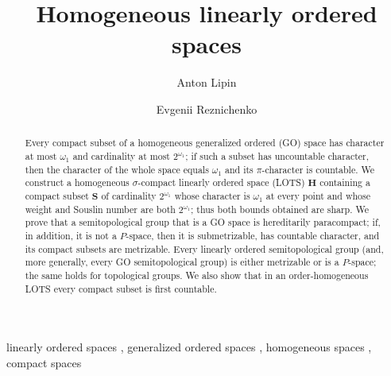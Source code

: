 \documentclass[preprint]{elsarticle}
\def\om{\omega}
\theoremstyle{definition}
\theoremstyle{remark}
\def\si{\sigma}
\def\sS{\mathbf{S}}
\def\Hs{\mathbf{H}}
\begin{document}

\begin{frontmatter}

\title{Homogeneous linearly ordered spaces}

\author{Anton Lipin}
\address{N.N.\ Krasovskii Institute of Mathematics and Mechanics, Ural Branch of the Russian Academy of Sciences, Yekaterinburg, Russia}

\author{Evgenii Reznichenko}
\address{Department of General Topology and Geometry, Mechanics and  Mathematics Faculty, M.~V.~Lomonosov Moscow State University, Leninskie Gory 1, Moscow, 199991 Russia}







\begin{abstract}
Every compact subset of a homogeneous generalized ordered (GO) space has character at most $\om_1$ and cardinality at most $2^{\om_1}$; if such a subset has uncountable character, then the character of the whole space equals $\om_1$ and its $\pi$-character is countable.
We construct a homogeneous $\si$-compact linearly ordered space (LOTS) $\Hs$ containing a compact subset $\sS$ of cardinality $2^{\om_1}$ whose character is $\om_1$ at every point and whose weight and Souslin number are both $2^{\om_1}$; thus both bounds obtained are sharp.
We prove that a semitopological group that is a GO space is hereditarily paracompact; if, in addition, it is not a $P$-space, then it is submetrizable, has countable character, and its compact subsets are metrizable.
Every linearly ordered semitopological group (and, more generally, every GO semitopological group) is either metrizable or is a $P$-space; the same holds for topological groups.
We also show that in an order-homogeneous LOTS every compact subset is first countable.
\end{abstract}
\begin{keyword}
linearly ordered spaces
\sep
generalized ordered spaces
\sep
homogeneous spaces
\sep
compact spaces
\end{keyword}
\end{frontmatter}
\end{document}
